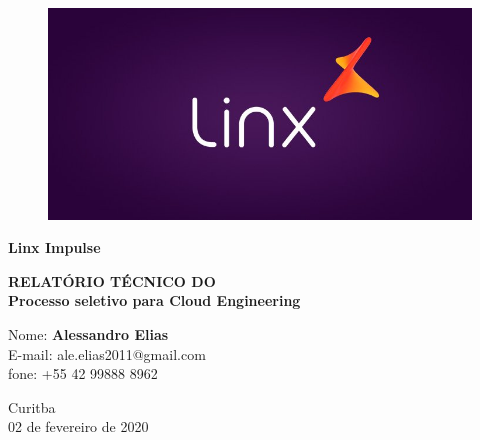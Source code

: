 \begin{titlepage}

  \begin{figure}[!ht]
    \filcenter
    \includegraphics[height=0.33\textheight, width=0.33\linewidth, keepaspectratio]{imagens/LINX-LOGO.jpg}
  \end{figure}
  \vspace{-2.5em}
  \begin{Large}
      \begin{center}
        \textbf{Linx Impulse}
  
        \vfill
  
        \textbf{RELATÓRIO TÉCNICO DO\\
        Processo seletivo para Cloud Engineering
      }
    \end{center}

    \vfill

    Nome: \textbf{Alessandro Elias}\\
    E-mail: ale.elias2011@gmail.com\\
    fone: +55 42 99888 8962

    \vfill
    
    \begin{center}
      Curitba\\
      02 de fevereiro de 2020
    \end{center}
  \end{Large}

  \clearpage
\end{titlepage}